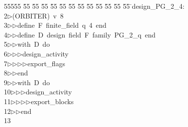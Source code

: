 %
%
\begin{tabbing}
55555 \= 55 \= 55 \= 55 \= 55 \= 55 \= 55 \= 55 \= 55 \= 55 \= 55 \= 55 \= 55 \= \>design\_PG\_2\_4:\\[0pt]
2\>$\triangleright$\>(ORBITER)\ v\ 8\ \\[0pt]
3\>$\triangleright$\>$\triangleright$\>define\ F\ finite\_field\ q\ 4\ end\ \\[0pt]
4\>$\triangleright$\>$\triangleright$\>define\ D\ design\ field\ F\ family\ PG\_2\_q\ end\ \\[0pt]
5\>$\triangleright$\>$\triangleright$\>with\ D\ do\ \\[0pt]
6\>$\triangleright$\>$\triangleright$\>$\triangleright$\>design\_activity\ \\[0pt]
7\>$\triangleright$\>$\triangleright$\>$\triangleright$\>$\triangleright$\>export\_flags\ \\[0pt]
8\>$\triangleright$\>$\triangleright$\>end\ \\[0pt]
9\>$\triangleright$\>$\triangleright$\>with\ D\ do\ \\[0pt]
10\>$\triangleright$\>$\triangleright$\>$\triangleright$\>design\_activity\ \\[0pt]
11\>$\triangleright$\>$\triangleright$\>$\triangleright$\>$\triangleright$\>export\_blocks\ \\[0pt]
12\>$\triangleright$\>$\triangleright$\>end\\[0pt]
13\>\end{tabbing}
